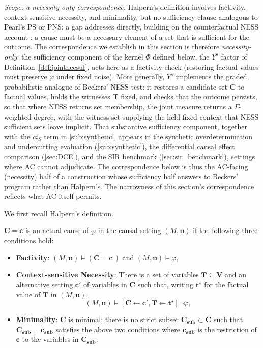 \medskip\noindent\textit{Scope: a necessity-only correspondence.} Halpern's definition
involves factivity, context-sensitive necessity, and minimality, but no sufficiency
clause analogous to Pearl's $\mathrm{PS}$ or $\mathrm{PNS}$: a gap
\citet{beckersSufficiency2021} addresses directly, building on the counterfactual NESS
account \citep{beckersNESS2021}: a cause must be a necessary element of a set that is
sufficient for the outcome. The correspondence we establish in this section is
therefore \emph{necessity-only}: the sufficiency component of the kernel $\Phi$
defined below, the $Y^s$ factor of Definition~\ref{def:jointnecsuf}, acts here as a
factivity check (restoring factual values must preserve $\varphi$ under fixed noise).
More generally, $Y^s$ implements the graded, probabilistic analogue of Beckers' NESS
test: it restores a
candidate set $\mathbf{C}$ to factual values, holds the witnesses $\mathbf{T}$ fixed,
and checks that the outcome persists, so that where NESS returns set membership,
the joint measure returns a $\Gamma$-weighted degree, with the witness set supplying
the held-fixed context that NESS sufficient sets leave implicit. That substantive
sufficiency component, together with the $ci_S$ term in \cref{sub:synthetic}, appears
in the synthetic overdetermination and undercutting evaluation (\cref{sub:synthetic}),
the differential causal effect comparison (\cref{sec:DCE}), and the SIR benchmark
(\cref{sec:sir_benchmark}), settings where AC cannot adjudicate. The correspondence below is thus the AC-facing (necessity) half of a
construction whose sufficiency half answers to Beckers' program rather than
Halpern's. The narrowness of this section's correspondence reflects what AC itself
permits.

We first recall Halpern's definition.

\begin{definition} \label{def:ac}
    \(\mathbf{C} = \mathbf{c}\) is an actual cause of \(\varphi\) in the causal setting \((M, \mathbf{u})\) if the following three conditions hold:
    \begin{itemize}
        \item \textbf{Factivity}: \((M, \mathbf{u}) \vDash (\mathbf{C} = \mathbf{c}\,)\) and \((M, \mathbf{u}) \vDash \varphi\),
        \item \textbf{Context-sensitive Necessity}: There is a set of variables \(\mathbf{T} \subseteq \mathbf{V}\) and an alternative setting \(\mathbf{c'}\) of variables in \(\mathbf{C}\) such that, writing $\mathbf{t^\star}$ for the factual value of $\mathbf{T}$ in $(M,\mathbf{u})$,
            \[(M, \mathbf{u}) \vDash [\mathbf{C} \leftarrow \mathbf{c'}, \mathbf{T} \leftarrow \mathbf{t^\star}] \neg \varphi,\]
        \item \textbf{Minimality}: \(\mathbf{C}\) is minimal; there is no strict subset \(\mathbf{C_{sub}} \subset \mathbf{C}\) such that \(\mathbf{C_{sub}} = \mathbf{c_{sub}}\) satisfies the above two conditions where $\mathbf{c_{sub}}$ is the restriction of \(\mathbf{c}\) to the variables in \(\mathbf{C_{sub}}\).
        \end{itemize}
\end{definition}

